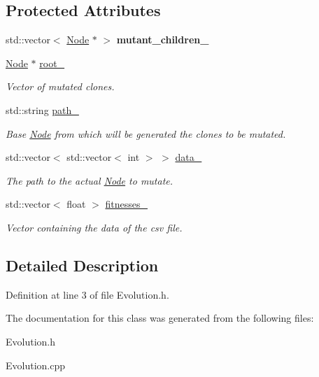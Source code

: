 \subsection*{Protected Attributes}
\begin{DoxyCompactItemize}
\item 
\mbox{\label{classEvolution_a80b78a81e6a45625ac7ec9385cdb5476}} 
std\+::vector$<$ \hyperlink{classNode}{Node} $\ast$ $>$ {\bfseries mutant\+\_\+children\+\_\+}
\item 
\mbox{\label{classEvolution_a2d2222876a0c4ccbd084a2397aa8dd77}} 
\hyperlink{classNode}{Node} $\ast$ \hyperlink{classEvolution_a2d2222876a0c4ccbd084a2397aa8dd77}{root\+\_\+}
\begin{DoxyCompactList}\small\item\em Vector of mutated clones. \end{DoxyCompactList}\item 
\mbox{\label{classEvolution_afce3ea47630dccad2760e3acae36e73e}} 
std\+::string \hyperlink{classEvolution_afce3ea47630dccad2760e3acae36e73e}{path\+\_\+}
\begin{DoxyCompactList}\small\item\em Base \hyperlink{classNode}{Node} from which will be generated the clones to be mutated. \end{DoxyCompactList}\item 
\mbox{\label{classEvolution_aa7234f8d9153dbbf9103d17729064ae0}} 
std\+::vector$<$ std\+::vector$<$ int $>$ $>$ \hyperlink{classEvolution_aa7234f8d9153dbbf9103d17729064ae0}{data\+\_\+}
\begin{DoxyCompactList}\small\item\em The path to the actual \hyperlink{classNode}{Node} to mutate. \end{DoxyCompactList}\item 
\mbox{\label{classEvolution_a9b9e7d53412a518ce862a0abfc06d149}} 
std\+::vector$<$ float $>$ \hyperlink{classEvolution_a9b9e7d53412a518ce862a0abfc06d149}{fitnesses\+\_\+}
\begin{DoxyCompactList}\small\item\em Vector containing the data of the csv file. \end{DoxyCompactList}\end{DoxyCompactItemize}


\subsection{Detailed Description}


Definition at line 3 of file Evolution.\+h.



The documentation for this class was generated from the following files\+:\begin{DoxyCompactItemize}
\item 
Evolution.\+h\item 
Evolution.\+cpp\end{DoxyCompactItemize}
